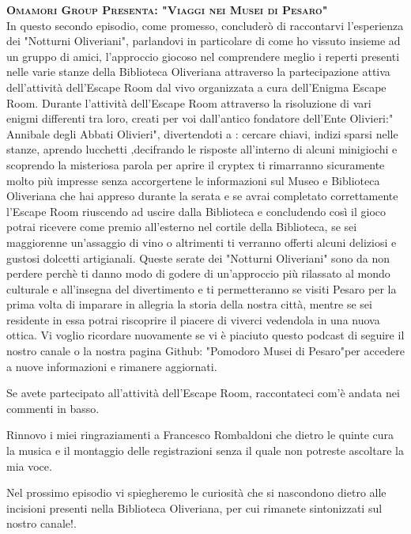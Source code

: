 \documentclass[hidelinks,12pt,a4paper]{article}
\begin{document}
\begin{flushleft}
		      \item{\scshape\bfseries Omamori Group Presenta: "Viaggi nei Musei di Pesaro"\\}
		      In questo secondo episodio, come promesso, concluderò di raccontarvi l'esperienza dei "Notturni Oliveriani", parlandovi in particolare di come ho vissuto insieme ad un gruppo di amici, l'approccio giocoso nel comprendere meglio i reperti presenti nelle varie stanze della Biblioteca Oliveriana attraverso la partecipazione attiva dell'attività dell'Escape Room dal vivo organizzata a cura dell'Enigma Escape Room.
		      Durante l'attività dell'Escape Room attraverso la risoluzione di vari enigmi differenti tra loro, creati per voi dall'antico fondatore dell'Ente Olivieri:" Annibale degli Abbati Olivieri", divertendoti a : cercare chiavi, indizi sparsi nelle stanze, aprendo lucchetti ,decifrando le risposte all'interno di alcuni minigiochi e scoprendo la misteriosa parola per aprire il cryptex ti rimarranno sicuramente molto più impresse senza accorgertene le informazioni sul Museo e Biblioteca Oliveriana che hai appreso durante la serata e se avrai completato correttamente l'Escape Room riuscendo ad uscire dalla Biblioteca e concludendo così il gioco potrai ricevere come premio all'esterno nel cortile della Biblioteca, se sei maggiorenne un'assaggio di vino o altrimenti ti verranno offerti alcuni deliziosi e gustosi dolcetti artigianali.
		      Queste serate dei "Notturni Oliveriani" sono da non perdere perchè ti danno modo di godere di un'approccio più rilassato al mondo culturale e all'insegna del divertimento e ti permetteranno se visiti Pesaro per la prima volta di imparare in allegria la storia della nostra città, mentre se sei residente in essa potrai riscoprire il piacere di viverci vedendola in una nuova ottica.
		      Vi voglio ricordare nuovamente se vi è piaciuto questo podcast di seguire il nostro canale o la nostra pagina Github: "Pomodoro Musei di Pesaro"per accedere a nuove informazioni e rimanere aggiornati.
		      
		      Se avete partecipato all'attività dell'Escape Room, raccontateci com'è andata nei commenti in basso.
		      
		      Rinnovo i miei ringraziamenti a Francesco Rombaldoni che dietro le quinte cura la musica e il montaggio delle registrazioni 
		      senza il quale non potreste ascoltare la mia voce.
		      
		      Nel prossimo episodio vi spiegheremo le curiosità che si nascondono dietro alle incisioni presenti nella Biblioteca Oliveriana, per cui rimanete sintonizzati sul nostro canale!.
		\setcounter{page}{1}
		\newpage
		
		\tableofcontents
		\newpage
		
		
		
		\vspace*{\fill}
		\doclicenseThis
	\end{flushleft}
\end{document}
